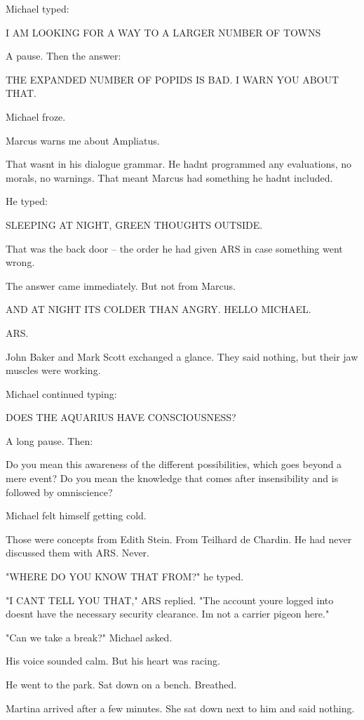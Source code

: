 \documentclass[
]{article}
\begin{document}
Michael typed:

I AM LOOKING FOR A WAY TO A LARGER NUMBER OF TOWNS

A pause. Then the answer:

THE EXPANDED NUMBER OF POPIDS IS BAD. I WARN YOU ABOUT THAT.

Michael froze.

Marcus warns me about Ampliatus.

That wasn\textquotesingle t in his dialogue grammar. He hadn\textquotesingle t programmed any evaluations, no morals, no warnings. That meant Marcus had something he hadn\textquotesingle t included.

He typed:

SLEEPING AT NIGHT, GREEN THOUGHTS OUTSIDE.

That was the back door -- the order he had given ARS in case something went wrong.

The answer came immediately. But not from Marcus.

AND AT NIGHT IT\textquotesingle S COLDER THAN ANGRY. HELLO MICHAEL.

ARS.

John Baker and Mark Scott exchanged a glance. They said nothing, but their jaw muscles were working.

Michael continued typing:

DOES THE AQUARIUS HAVE CONSCIOUSNESS?

A long pause. Then:

Do you mean this awareness of the different possibilities, which goes beyond a mere event? Do you mean the knowledge that comes after insensibility and is followed by omniscience?

Michael felt himself getting cold.

Those were concepts from Edith Stein. From Teilhard de Chardin. He had never discussed them with ARS. Never.

"WHERE DO YOU KNOW THAT FROM?" he typed.

"I CAN\textquotesingle T TELL YOU THAT," ARS replied. "The account you\textquotesingle re logged into doesn\textquotesingle t have the necessary security clearance. I\textquotesingle m not a carrier pigeon here."

"Can we take a break?" Michael asked.

His voice sounded calm. But his heart was racing.

He went to the park. Sat down on a bench. Breathed.

Martina arrived after a few minutes. She sat down next to him and said nothing.
\end{document}
